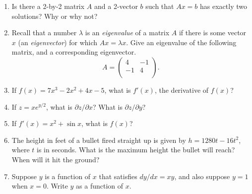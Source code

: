 \documentclass[11pt]{article}
\begin{document}
\begin{enumerate}
\item
Is there a 2-by-2 matrix $A$ and a 2-vector $b$ such that $Ax=b$ has
exactly two solutions?  Why or why not?

\item
Recall that a number $\lambda$ is an {\em eigenvalue} 
of a matrix $A$ if there is some vector $x$ 
(an {\em eigenvector}) for which $Ax = \lambda x$.
Give an eigenvalue of the following matrix, and a corresponding eigenvector.
$$ A = \left(
\begin{array}{cc}
4 & -1 \\ 	
-1 & 4 \\
\end{array} 
\right). $$

\item
If $f(x)=7x^3-2x^2+4x-5$, what is $f'(x)$, the derivative of $f(x)$?

\item
If $z = xe^{y/2}$, what is $\partial z / \partial x$?
What is $\partial z / \partial y$?

\item
If $f'(x) = x^2 + \sin x$, what is $f(x)$?

\item
The height in feet of a bullet fired straight up is
given by $h=1280t-16t^2$, where $t$ is in seconds.
What is the maximum height the bullet will reach? 
When will it hit the ground?

\item
Suppose $y$ is a function of $x$ that satisfies
$dy/dx = xy$, and also suppose $y=1$ when $x=0$.
Write $y$ as a function of $x$.

\end{enumerate}
\end{document}
